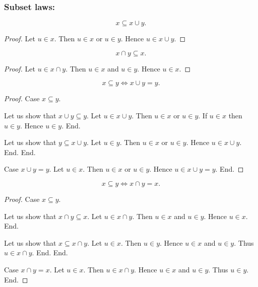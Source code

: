 \documentclass[../../set-theory.ftl.tex]{subfiles}
\begin{document}
  \subsubsection*{Subset laws:}

  \begin{forthel}
    \begin{proposition}\label{SetTheory_01_01_628970}
      \[ x \subseteq x \cup y. \]
    \end{proposition}
    \begin{proof}
      Let $u \in x$.
      Then $u \in x$ or $u \in y$.
      Hence $u \in x \cup y$.
    \end{proof}

    \begin{proposition}\label{SetTheory_01_01_368515}
      \[ x \cap y \subseteq x. \]
    \end{proposition}
    \begin{proof}
      Let $u \in x \cap y$.
      Then $u \in x$ and $u \in y$.
      Hence $u \in x$.
    \end{proof}

    \begin{proposition}\label{SetTheory_01_01_591527}
      \[ x \subseteq y \iff x \cup y = y. \]
    \end{proposition}
    \begin{proof}
      Case $x \subseteq y$.

        Let us show that $x \cup y \subseteq y$.
          Let $u \in x \cup y$.
          Then $u \in x$ or $u \in y$.
          If $u \in x$ then $u \in y$.
          Hence $u \in y$.
        End.

        Let us show that $y \subseteq x \cup y$.
          Let $u \in y$.
          Then $u \in x$ or $u \in y$.
          Hence $u \in x \cup y$.
        End.
      End.

      Case $x \cup y = y$.
        Let $u \in x$.
        Then $u \in x$ or $u \in y$.
        Hence $u \in x \cup y = y$.
      End.
    \end{proof}

    \begin{proposition}\label{SetTheory_01_01_681535}
      \[ x \subseteq y \iff x \cap y = x. \]
    \end{proposition}
    \begin{proof}
      Case $x \subseteq y$.

        Let us show that $x \cap y \subseteq x$.
          Let $u \in x \cap y$.
          Then $u \in x$ and $u \in y$.
          Hence $u \in x$.
        End.

        Let us show that $x \subseteq x \cap y$.
          Let $u \in x$.
          Then $u \in y$.
          Hence $u \in x$ and $u \in y$.
          Thus $u \in x \cap y$.
        End.
      End.

      Case $x \cap y = x$.
        Let $u \in x$.
        Then $u \in x \cap y$.
        Hence $u \in x$ and $u \in y$.
        Thus $u \in y$.
      End.
    \end{proof}
  \end{forthel}
\end{document}
